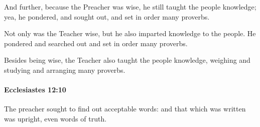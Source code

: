 			\begin{versebox}
					\item[BHS] 
					\item[LXX] 
					\item[ASV] And further, because the Preacher was wise, he still taught the people knowledge; yea, he pondered, and sought out, and set in order many proverbs.
					\item[NIV] Not only was the Teacher wise, but he also imparted knowledge to the people. He pondered and searched out and set in order many proverbs.
					\item[NRSV] Besides being wise, the Teacher also taught the people knowledge, weighing and studying and arranging many proverbs.
			\end{versebox}

		\paragraph{Ecclesiastes 12:10} %
			\label{ECCLESIASTES-12-10}

			The preacher sought to find out acceptable words: and that which was written was upright, even words of truth.

